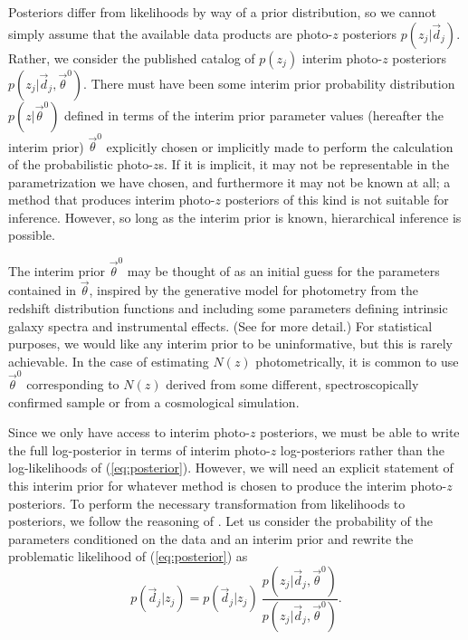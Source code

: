 \documentclass[preprint]{aastex}
\begin{document}
Posteriors differ from likelihoods by way of a prior distribution, so we cannot 
simply assume that the available data products are photo-$z$ posteriors 
$p(z_{j}|\vec{d}_{j})$.  Rather, we consider the published catalog of 
$p(z_{j})$ interim photo-$z$ posteriors 
$p(z_{j}|\vec{d}_{j},\vec{\theta}^{0})$.  There must have been some interim 
prior probability distribution $p(z|\vec{\theta}^{0})$ defined in terms of the 
interim prior parameter values (hereafter the interim prior) $\vec{\theta}^{0}$ 
explicitly chosen or implicitly made to perform the calculation of the 
probabilistic photo-$z$s.  If it is implicit, it may not be representable in 
the parametrization we have chosen, and furthermore it may not be known at all; 
a method that produces interim photo-$z$ posteriors of this kind is not 
suitable for inference.  However, so long as the interim prior is known, 
hierarchical inference is possible. 

The interim prior $\vec{\theta}^{0}$ may be thought of as an initial guess for 
the parameters contained in $\vec{\theta}$, inspired by the generative model 
for photometry from the redshift distribution functions and including some 
parameters defining intrinsic galaxy spectra and instrumental effects. (See 
\citealt{Benitez2000} for more detail.)  For statistical purposes, we would 
like any interim prior to be uninformative, but this is rarely achievable.  In 
the case of estimating $N(z)$ photometrically, it is common to use 
$\vec{\theta}^{0}$ corresponding to $N(z)$ derived from some different, 
spectroscopically confirmed sample or from a cosmological simulation.

Since we only have access to interim photo-$z$ posteriors, we must be able to 
write the full log-posterior in terms of interim photo-$z$ log-posteriors 
rather than the log-likelihoods of (\ref{eq:posterior}).  However, we will need 
an explicit statement of this interim prior for whatever method is chosen to 
produce the interim photo-$z$ posteriors.  To perform the necessary 
transformation from likelihoods to posteriors, we follow the reasoning of 
\citet{Marshall2015}.  Let us consider the probability of the parameters 
conditioned on the data and an interim prior and rewrite the problematic 
likelihood of (\ref{eq:posterior}) as 
\begin{equation}
\label{eq:trick}
p(\vec{d}_{j}|z_{j}) = p(\vec{d}_{j}|z_{j})\ 
\frac{p(z_{j}|\vec{d}_{j},\vec{\theta}^{0})}{p(z_{j}|\vec{d}_{j},\vec{\theta}^{0
})}.
\end{equation}
\end{document}
